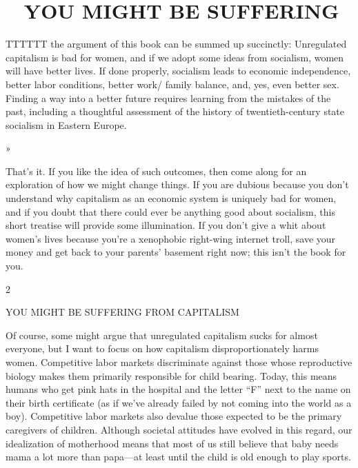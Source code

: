 \chapter{~ YOU MIGHT BE SUFFERING}\label{~ YOU MIGHT BE SUFFERING}
 \par 
TTTTTT the argument of this book can be summed up succinctly: Unregulated capitalism is bad for women, and if we adopt some ideas from socialism, women will have better lives. If done properly, socialism leads to economic independence, better labor conditions, better work/ family balance, and, yes, even better sex. Finding a way into a better future requires learning from the mistakes of the past, including a thoughtful assessment of the history of twentieth-century state socialism in Eastern Europe.
 \par 
»
 \par 
That’s it. If you like the idea of such outcomes, then come along for an exploration of how we might change things. If you are dubious because you don’t understand why capitalism as an economic system is uniquely bad for women, and if you doubt that there could ever be anything good about socialism, this short treatise will provide some illumination. If you don’t give a whit about women’s lives because you're a xenophobic right-wing internet troll, save your money and get back to your parents’ basement right now; this isn’t the book for you.
 \par 
2
 \par 
YOU MIGHT BE SUFFERING FROM CAPITALISM
 \par 
Of course, some might argue that unregulated capitalism sucks for almost everyone, but I want to focus on how capitalism disproportionately harms women. Competitive labor markets discriminate against those whose reproductive biology makes them primarily responsible for child bearing. Today, this means humans who get pink hats in the hospital and the letter “F” next to the name on their birth certificate (as if we've already failed by not coming into the world as a boy). Competitive labor markets also devalue those expected to be the primary caregivers of children. Although societal attitudes have evolved in this regard, our idealization of motherhood means that most of us still believe that baby needs mama a lot more than papa—at least until the child is old enough to play sports.
 \par 

